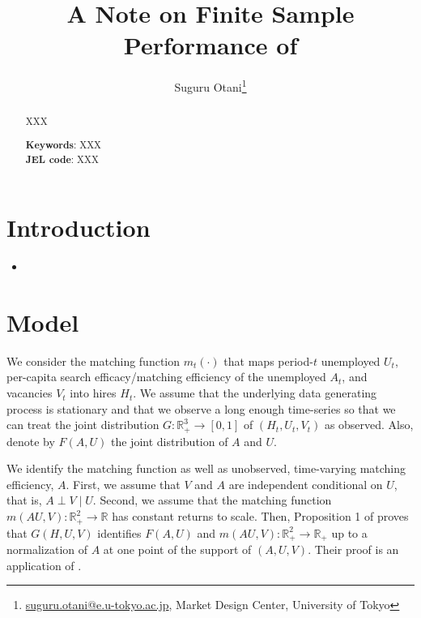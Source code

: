 \documentclass[12pt]{article}
\begin{document}
\title{A Note on Finite Sample Performance of \cite{lange2020beyond}}
\author{Suguru Otani\thanks{\href{mailto:}{suguru.otani@e.u-tokyo.ac.jp}, Market Design Center, University of Tokyo}}
\maketitle

\begin{abstract}
\noindent
XXX

\textbf{Keywords}: XXX \\
\textbf{JEL code}: XXX
\end{abstract}

\section{Introduction}

\begin{itemize}
    \item 
\end{itemize}

\section{Model}
We consider the matching function $m_t(\cdot)$ that maps period-$t$ unemployed $U_t$, per-capita search efficacy/matching efficiency of the unemployed $A_t$, and vacancies $V_t$ into hires $H_t$.
We assume that the underlying data generating process is stationary and that we observe a long enough time-series so that we can treat the joint distribution $G: \mathbb{R}_{+}^3 \rightarrow[0,1]$ of $\left(H_t, U_t, V_t\right)$ as observed. 
Also, denote by $F(A, U)$ the joint distribution of $A$ and $U$.

We identify the matching function as well as unobserved, time-varying matching efficiency, $A .$ 
First, we assume that $V$ and $A$ are independent conditional on $U$, that is, $A \perp V \mid U$. 
Second, we assume that the matching function $m(AU,V):\mathbb{R}_{+}^2 \rightarrow \mathbb{R}$ has constant returns to scale. 
Then, Proposition 1 of \cite{lange2020beyond} proves that $G(H, U, V)$ identifies $F(A, U)$ and $m(A U, V): \mathbb{R}_{+}^2 \rightarrow \mathbb{R}_{+}$ up to a normalization of $A$ at one point of the support of $(A, U, V)$. Their proof is an application of \cite{matzkin2003nonparametric}.
\end{document}
